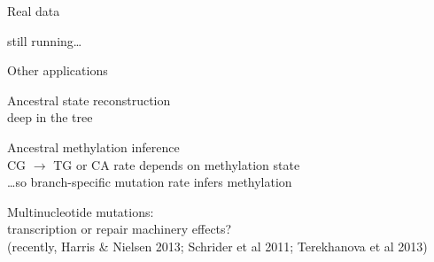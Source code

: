 \documentclass[smaller]{beamer}
\begin{document}
\begin{frame}{Real data}

  still running\ldots

\end{frame}

\begin{frame}{Other applications}

  Ancestral state reconstruction \\
  \hspace{2em} deep in the tree
    
  \vspace{3em}

  Ancestral methylation inference\\
  \hspace{2em} CG $\to$ TG or CA rate depends on methylation state \\
  \hspace{2em} \ldots so branch-specific mutation rate infers methylation
    
  \vspace{3em}

  Multinucleotide mutations: \\
  \hspace{2em} transcription or repair machinery effects? \\
  \hspace{2em} {\aside (recently, Harris \& Nielsen 2013; Schrider et al 2011; Terekhanova et al 2013)}

\end{frame}
\end{document}
